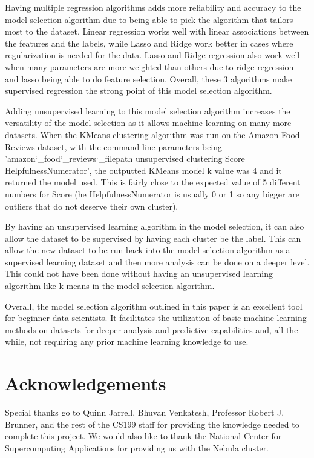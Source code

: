 \documentclass[9pt,twocolumn,twoside]{idsi}
\begin{document}
Having multiple regression algorithms adds more reliability and accuracy to the model selection algorithm due to being able to pick the algorithm that tailors most to the dataset. Linear regression works well with linear associations between the features and the labels, while Lasso and Ridge work better in cases where regularization is needed for the data. Lasso and Ridge regression also work well when many parameters are more weighted than others due to ridge regression and lasso being able to do feature selection. Overall, these 3 algorithms make supervised regression the strong point of this model selection algorithm.

Adding unsupervised learning to this model selection algorithm increases the versatility of the model selection as it allows machine learning on many more datasets. When the KMeans clustering algorithm was run on the Amazon Food Reviews dataset, with the command line parameters being 'amazon\char`_food\char`_reviews\char`_filepath unsupervised clustering Score HelpfulnessNumerator', the outputted KMeans model k value was 4 and it returned the model used. This is fairly close to the expected value of 5 different numbers for Score (he HelpfulnessNumerator is usually 0 or 1 so any bigger are outliers that do not deserve their own cluster). 

By having an unsupervised learning algorithm in the model selection, it can also allow the dataset to be supervised by having each cluster be the label. This can allow the new dataset to be run back into the model selection algorithm as a supervised learning dataset and then more analysis can be done on a deeper level. This could not have been done without having an unsupervised learning algorithm like k-means in the model selection algorithm. 

Overall, the model selection algorithm outlined in this paper is an excellent tool for beginner data scientists. It facilitates the utilization of basic machine learning methods on datasets for deeper analysis and predictive capabilities and, all the while, not requiring any prior machine learning knowledge to use. 

\section{Acknowledgements}
Special thanks go to Quinn Jarrell, Bhuvan Venkatesh, Professor Robert J. Brunner, and the rest of the CS199 staff for providing the knowledge needed to complete this project. We would also like to thank the National Center for Supercomputing Applications for providing us with the Nebula cluster. 
\end{document}
